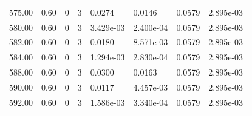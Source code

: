 \documentclass[preview]{standalone}
\begin{document}
{{{{{\begin{tabular}{L{1.2cm}C{1.2cm} C{0.3cm}C{0.5cm} C{1.4cm}C{1.4cm} C{1.4cm}C{1.4cm}}
  575.00  &  0.60  & 0     &  3 &  0.0274  & 0.0146  & 0.0579 &  2.895e-03   \\ 
  580.00  &  0.60  & 0     &  3 &  3.429e-03  & 2.400e-04  & 0.0579 &  2.895e-03   \\ 
  582.00  &  0.60  & 0     &  3 &  0.0180  & 8.571e-03  & 0.0579 &  2.895e-03   \\ 
  584.00  &  0.60  & 0     &  3 &  1.294e-03  & 2.830e-04  & 0.0579 &  2.895e-03   \\ 
  588.00  &  0.60  & 0     &  3 &  0.0300  & 0.0163  & 0.0579 &  2.895e-03   \\ 
  590.00  &  0.60  & 0     &  3 &  0.0117  & 4.457e-03  & 0.0579 &  2.895e-03   \\ 
  592.00  &  0.60  & 0     &  3 &  1.586e-03  & 3.340e-04  & 0.0579 &  2.895e-03   \\ 
\hline 
\end{tabular} 

}}}}}
\end{document}
